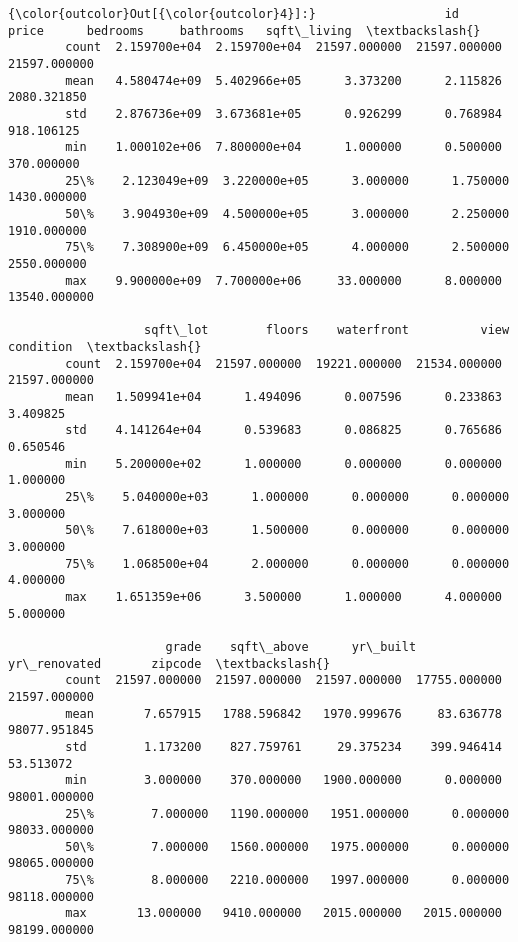 \documentclass[11pt]{article}
\begin{document}
\begin{Verbatim}[commandchars=\\\{\}]
{\color{outcolor}Out[{\color{outcolor}4}]:}                  id         price      bedrooms     bathrooms   sqft\_living  \textbackslash{}
        count  2.159700e+04  2.159700e+04  21597.000000  21597.000000  21597.000000   
        mean   4.580474e+09  5.402966e+05      3.373200      2.115826   2080.321850   
        std    2.876736e+09  3.673681e+05      0.926299      0.768984    918.106125   
        min    1.000102e+06  7.800000e+04      1.000000      0.500000    370.000000   
        25\%    2.123049e+09  3.220000e+05      3.000000      1.750000   1430.000000   
        50\%    3.904930e+09  4.500000e+05      3.000000      2.250000   1910.000000   
        75\%    7.308900e+09  6.450000e+05      4.000000      2.500000   2550.000000   
        max    9.900000e+09  7.700000e+06     33.000000      8.000000  13540.000000   
        
                   sqft\_lot        floors    waterfront          view     condition  \textbackslash{}
        count  2.159700e+04  21597.000000  19221.000000  21534.000000  21597.000000   
        mean   1.509941e+04      1.494096      0.007596      0.233863      3.409825   
        std    4.141264e+04      0.539683      0.086825      0.765686      0.650546   
        min    5.200000e+02      1.000000      0.000000      0.000000      1.000000   
        25\%    5.040000e+03      1.000000      0.000000      0.000000      3.000000   
        50\%    7.618000e+03      1.500000      0.000000      0.000000      3.000000   
        75\%    1.068500e+04      2.000000      0.000000      0.000000      4.000000   
        max    1.651359e+06      3.500000      1.000000      4.000000      5.000000   
        
                      grade    sqft\_above      yr\_built  yr\_renovated       zipcode  \textbackslash{}
        count  21597.000000  21597.000000  21597.000000  17755.000000  21597.000000   
        mean       7.657915   1788.596842   1970.999676     83.636778  98077.951845   
        std        1.173200    827.759761     29.375234    399.946414     53.513072   
        min        3.000000    370.000000   1900.000000      0.000000  98001.000000   
        25\%        7.000000   1190.000000   1951.000000      0.000000  98033.000000   
        50\%        7.000000   1560.000000   1975.000000      0.000000  98065.000000   
        75\%        8.000000   2210.000000   1997.000000      0.000000  98118.000000   
        max       13.000000   9410.000000   2015.000000   2015.000000  98199.000000   
        

\end{Verbatim}
\end{document}
